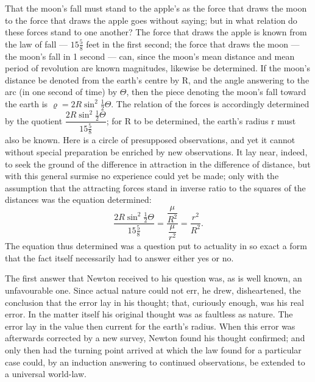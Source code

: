 \documentclass[12pt,a4paper]{book}
\begin{document}
That the moon's fall must stand to the apple's as the force that draws the moon to the
force that draws the apple goes without saying; but in what relation do these forces
stand to
one another? The force that draws the apple is known from the law of fall ---
$15\tfrac{5}{8}$ feet in the first second; the force that draws the moon --- the moon's
fall in 1 second --- can, since the moon's mean distance and mean period of revolution
are known magnitudes, likewise be determined. If the moon's distance be denoted
from the earth's centre by R, and the angle answering to the arc (in one second of
time) by $\Theta$, then the piece denoting the moon's fall toward the earth is
$\varrho = 2 R \sin^{2} \tfrac{1}{2} \Theta$. The relation of the forces is
accordingly determined by the quotient
$\dfrac{2 R \sin^{2} \tfrac{1}{2} \Theta}{15\tfrac{5}{8}}$;
for R to be determined, the earth's radius r must also be known. Here is a circle of
presupposed observations, and yet it cannot without special preparation be enriched by
new observations. It lay near, indeed, to seek the ground of the difference in
attraction in the difference of distance, but with this general surmise no experience
could yet be made; only with the assumption that the attracting forces stand in inverse
ratio to the squares of the distances was the equation determined:
\[
\frac{2 R \sin^{2} \tfrac{1}{2} \Theta}{15\tfrac{5}{8}}
  = \frac{\dfrac{\mu}{R^{2}}}{\dfrac{\mu}{r^{2}}}
  = \frac{r^{2}}{R^{2}}.
\]
The equation thus determined was a question put to actuality in so exact a form that
the fact itself necessarily had to answer either yes or no.

The first answer that Newton received to his question was, as is well known, an
unfavourable one.
Since actual nature could not err, he drew, disheartened, the conclusion that the error
lay in his thought; that, curiously enough, was his real error. In the matter itself his
original thought was as faultless as nature. The error lay in the value then current for
the earth's radius. When this error was afterwards corrected by a new survey, Newton
found his thought confirmed; and only then had the turning point arrived at which the
law found for a particular case could, by an induction answering to continued
observations, be extended to a universal world-law.
\end{document}
